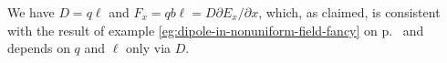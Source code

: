 We have $D=q\ell$ and $F_x=qb\ell=D\partial E_x/\partial x$, which, as
claimed, is consistent with the result of example
\ref{eg:dipole-in-nonuniform-field-fancy} on p.~\pageref{eg:dipole-in-nonuniform-field-fancy}
and depends on $q$ and $\ell$ only via $D$.
